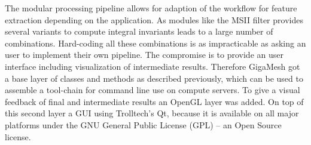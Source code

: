 \documentclass[openany]{book}
\begin{document}
The modular processing pipeline allows for adaption of the workflow for feature 
extraction depending on the application. As modules like the MSII filter 
provides several variants to compute integral invariants leads to a large number 
of combinations. Hard-coding all these combinations is as impracticable as 
asking an user to implement their own pipeline. The compromise is to provide an 
user interface including visualization of intermediate results.
Therefore GigaMesh got a base layer of classes and methods as described 
previously, which can be used to assemble a tool-chain for command line use on 
compute servers. To give a visual feedback of final and intermediate results an 
OpenGL layer was added. On top of this second layer a GUI using Trolltech’s Qt, 
because it is available on all major platforms under the GNU General Public 
License (GPL) – an Open Source license.
\end{document}

